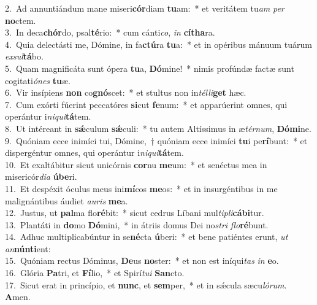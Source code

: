 {2.~}Ad annuntiándum mane miseri\textbf{cór}diam \textbf{tu}am:~* et veritátem tu\textit{am} \textit{per} \textbf{no}ctem.\\
{3.~}In deca\textbf{chór}do, psal\textbf{té}rio:~* cum cánti\textit{co}, \textit{in} \textbf{cí}\textbf{tha}ra.\\
{4.~}Quia delectásti me, Dómine, in fa\textbf{ctú}ra \textbf{tu}a:~* et in opéribus mánuum tuárum \textit{ex}\textit{sul}\textbf{tá}bo.\\
{5.~}Quam magnificáta sunt ópera \textbf{tu}a, \textbf{Dó}mine!~* nimis profúndæ factæ sunt cogitati\textit{ó}\textit{nes} \textbf{tu}æ.\\
{6.~}Vir insípiens \textbf{non} co\textbf{gnó}scet:~* et stultus non in\textit{tél}\textit{li}\textbf{get} hæc.\\
{7.~}Cum exórti fúerint peccatóres \textbf{si}cut \textbf{fe}num:~* et apparúerint omnes, qui operántur i\textit{ni}\textit{qui}\textbf{tá}tem.\\
{8.~}Ut intéreant in \textbf{sǽ}culum \textbf{sǽ}culi:~* tu autem Altíssimus in æ\textit{tér}\textit{num}, \textbf{Dó}\textbf{mi}ne.\\
{9.~}Quóniam ecce inimíci tui, Dómine,~† quóniam ecce inimíci \textbf{tu}i pe\textbf{rí}bunt:~* et dispergéntur omnes, qui operántur i\textit{ni}\textit{qui}\textbf{tá}tem.\\
{10.~}Et exaltábitur sicut unicórnis \textbf{cor}nu \textbf{me}um:~* et senéctus mea in misericór\textit{di}\textit{a} \textbf{ú}\textbf{be}ri.\\
{11.~}Et despéxit óculus meus ini\textbf{mí}cos \textbf{me}os:~* et in insurgéntibus in me malignántibus áudiet \textit{au}\textit{ris} \textbf{me}a.\\
{12.~}Justus, ut \textbf{pal}ma flo\textbf{ré}bit:~* sicut cedrus Líbani mul\textit{ti}\textit{pli}\textbf{cá}\textbf{bi}tur.\\
{13.~}Plantáti in \textbf{do}mo \textbf{Dó}mini,~* in átriis domus Dei no\textit{stri} \textit{flo}\textbf{ré}bunt.\\
{14.~}Adhuc multiplicabúntur in se\textbf{né}cta \textbf{ú}beri:~* et bene patiéntes erunt, \textit{ut} \textit{an}\textbf{nún}\textbf{ti}ent:\\
{15.~}Quóniam rectus Dóminus, \textbf{De}us \textbf{no}ster:~* et non est iníqui\textit{tas} \textit{in} \textbf{e}o.\\
{16.~}Glória \textbf{Pa}tri, et \textbf{Fí}lio,~* et Spirí\textit{tu}\textit{i} \textbf{San}cto.\\
{17.~}Sicut erat in princípio, et \textbf{nunc}, et \textbf{sem}per,~* et in sǽcula sæcu\textit{ló}\textit{rum}. \textbf{A}men.\\
